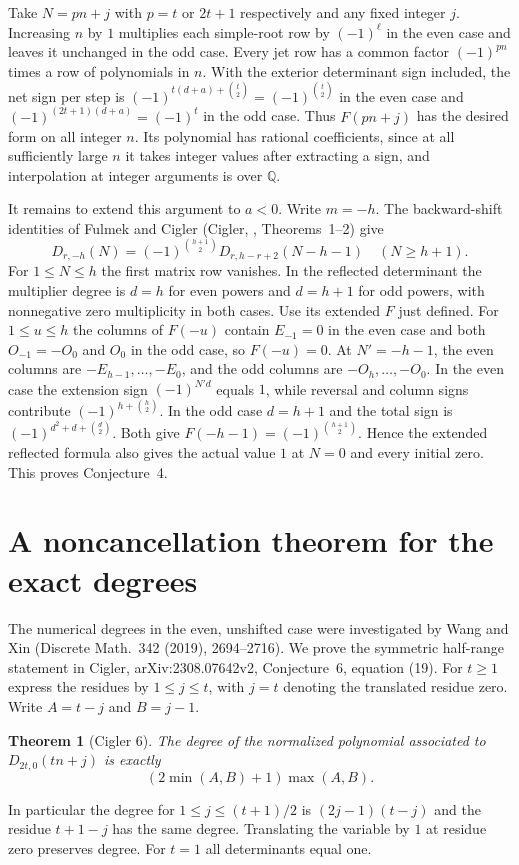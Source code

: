 \documentclass[11pt,a4paper]{article}
\newtheorem{theorem}{Theorem}[section]\newtheorem{lemma}[theorem]{Lemma}
\theoremstyle{definition}\newtheorem{problem}[theorem]{Auxiliary problem}
\theoremstyle{remark}\newtheorem*{remark}{Remark}
\begin{document}
Take $N=pn+j$ with $p=t$ or $2t+1$ respectively and any fixed integer $j$. Increasing $n$ by $1$ multiplies each simple-root row by $(-1)^\ell$ in the even case and leaves it unchanged in the odd case. Every jet row has a common factor $(-1)^{pn}$ times a row of polynomials in $n$. With the exterior determinant sign included, the net sign per step is $(-1)^{t(d+a)+\binom t2}=(-1)^{\binom t2}$ in the even case and $(-1)^{(2t+1)(d+a)}=(-1)^t$ in the odd case. Thus $F(pn+j)$ has the desired form on all integer $n$. Its polynomial has rational coefficients, since at all sufficiently large $n$ it takes integer values after extracting a sign, and interpolation at integer arguments is over $\mathbb Q$.

It remains to extend this argument to $a<0$. Write $m=-h$. The backward-shift identities of Fulmek and Cigler (Cigler, \cite{Back}, Theorems~1--2) give
\[
D_{r,-h}(N)=(-1)^{\binom{h+1}2}D_{r,h-r+2}(N-h-1)\quad(N\ge h+1).
\]
For $1\le N\le h$ the first matrix row vanishes. In the reflected determinant the multiplier degree is $d=h$ for even powers and $d=h+1$ for odd powers, with nonnegative zero multiplicity in both cases. Use its extended $F$ just defined. For $1\le u\le h$ the columns of $F(-u)$ contain $E_{-1}=0$ in the even case and both $O_{-1}=-O_0$ and $O_0$ in the odd case, so $F(-u)=0$. At $N'=-h-1$, the even columns are $-E_{h-1},\ldots,-E_0$, and the odd columns are $-O_h,\ldots,-O_0$. In the even case the extension sign $(-1)^{N'd}$ equals $1$, while reversal and column signs contribute $(-1)^{h+\binom h2}$. In the odd case $d=h+1$ and the total sign is $(-1)^{d^2+d+\binom d2}$. Both give $F(-h-1)=(-1)^{\binom{h+1}2}$. Hence the extended reflected formula also gives the actual value $1$ at $N=0$ and every initial zero. This proves Conjecture~4.

\section{A noncancellation theorem for the exact degrees}
The numerical degrees in the even, unshifted case were investigated by Wang and Xin (Discrete Math.\ 342 (2019), 2694--2716). We prove the symmetric half-range statement in Cigler, arXiv:2308.07642v2, Conjecture~6, equation (19). For $t\ge1$ express the residues by $1\le j\le t$, with $j=t$ denoting the translated residue zero. Write $A=t-j$ and $B=j-1$.\begin{theorem}[Cigler 6] The degree of the normalized polynomial associated to $D_{2t,0}(tn+j)$ is exactly
\[
\boxed{\ (2\min(A,B)+1)\max(A,B).\ }
\]
\end{theorem} In particular the degree for $1\le j\le(t+1)/2$ is $(2j-1)(t-j)$ and the residue $t+1-j$ has the same degree. Translating the variable by $1$ at residue zero preserves degree. For $t=1$ all determinants equal one.
\end{document}
